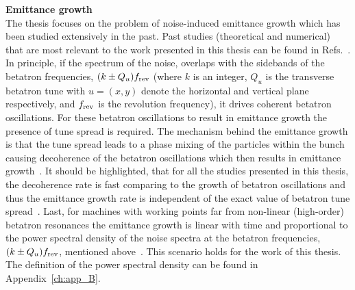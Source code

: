 \textbf{Emittance growth}\\
The thesis focuses on the problem of noise-induced emittance growth which has been studied extensively in the past. Past studies (theoretical and numerical) that are most relevant to the work presented in this thesis can be found in Refs.~\cite{Lebedev:248620, Lebedev:248622, PhysRevSTAB.18.101001}. In principle, if the spectrum of the noise, overlaps with the sidebands of the betatron frequencies, $(k \pm Q_u) {f_\mathrm{rev}}$ (where $k$ is an integer, $Q_u$ is the transverse betatron tune with $u=(x,y)$ denote the horizontal and vertical plane respectively, and ${f_\mathrm{rev}}$ is the revolution frequency), it drives coherent betatron oscillations. For these betatron oscillations to result in emittance growth the presence of tune spread is required. The mechanism behind the emittance growth is that the tune spread leads to a phase mixing of the particles within the bunch causing decoherence of the betatron oscillations which then results in emittance growth~\cite{Lebedev:248620}. It should be highlighted, that for all the studies presented in this thesis, the decoherence rate is fast comparing to the growth of betatron oscillations and thus the emittance growth rate is independent of the exact value of betatron tune spread~\cite{Lebedev:248620}. Last, for machines with working points far from non-linear (high-order) betatron resonances the emittance growth is linear with time and proportional to the power spectral density of the noise spectra at the betatron frequencies, $(k \pm Q_u) {f_\mathrm{rev}}$, mentioned above~\cite{Lebedev:248620}. This scenario holds for the work of this thesis. The definition of the power spectral density can be found in Appendix~\ref{ch:app_B}. 



